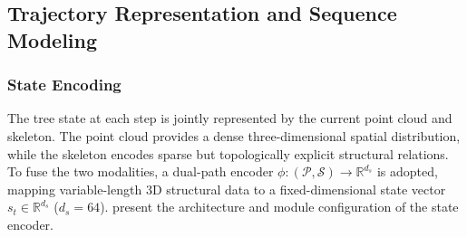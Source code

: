 \documentclass[12pt,a4paper,fontset=fandol]{ctexart}
\begin{document}
\subsection{Trajectory Representation and Sequence Modeling}\label{sec:model:formulation}

\subsubsection{State Encoding}

The tree state at each step is jointly represented by the current point cloud and skeleton.
The point cloud provides a dense three-dimensional spatial distribution,
while the skeleton encodes sparse but topologically explicit structural relations.
To fuse the two modalities, a dual-path encoder $\phi: (\mathcal{P}, \mathcal{S}) \to \mathbb{R}^{d_s}$ is adopted,
mapping variable-length 3D structural data to a fixed-dimensional state vector $s_t \in \mathbb{R}^{d_s}$ ($d_s = 64$).
 present the architecture and module configuration of the state encoder.
\end{document}

